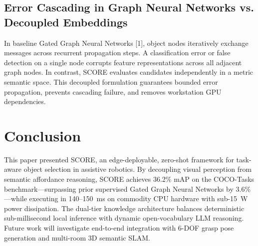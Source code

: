 \documentclass[conference]{IEEEtran}
\begin{document}
\subsection{Error Cascading in Graph Neural Networks vs. Decoupled Embeddings}
In baseline Gated Graph Neural Networks [1], object nodes iteratively exchange messages across recurrent propagation steps. A classification error or false detection on a single node corrupts feature representations across all adjacent graph nodes. In contrast, SCORE evaluates candidates independently in a metric semantic space. This decoupled formulation guarantees bounded error propagation, prevents cascading failure, and removes workstation GPU dependencies.

\section{Conclusion}
This paper presented SCORE, an edge-deployable, zero-shot framework for task-aware object selection in assistive robotics. By decoupling visual perception from semantic affordance reasoning, SCORE achieves 36.2\% mAP on the COCO-Tasks benchmark---surpassing prior supervised Gated Graph Neural Networks by 3.6\%---while executing in 140--150~ms on commodity CPU hardware with sub-15~W power dissipation. The dual-tier knowledge architecture balances deterministic sub-millisecond local inference with dynamic open-vocabulary LLM reasoning. Future work will investigate end-to-end integration with 6-DOF grasp pose generation and multi-room 3D semantic SLAM.
\end{document}
